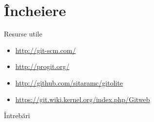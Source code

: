 \documentclass{beamer}
\begin{document}
\section{Încheiere}

\begin{frame}{Resurse utile}
	\begin{itemize}
		\item \url{http://git-scm.com/}
		\item \url{http://progit.org/}
		\item \url{http://github.com/sitaramc/gitolite}
		\item \url{https://git.wiki.kernel.org/index.php/Gitweb}
	\end{itemize}
\end{frame}

\begin{frame}{Întrebări}
\end{frame}
\end{document}
